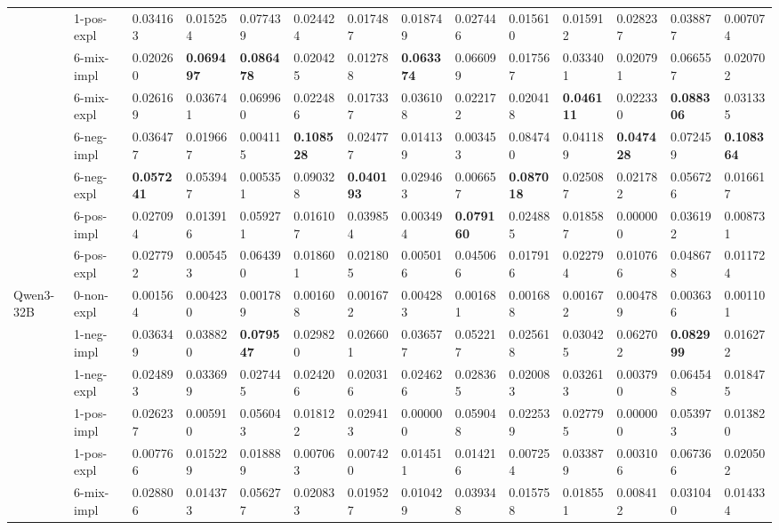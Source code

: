 \begin{tabular}{ll|llll|llll|llll}
 & 1-pos-expl & 0.034163 & 0.015254 & 0.077439 & 0.024424 & 0.017487 & 0.018749 & 0.027446 & 0.015610 & 0.015912 & 0.028237 & 0.038877 & 0.007074 \\
 & 6-mix-impl & 0.020260 & \bfseries 0.069497 & \bfseries 0.086478 & 0.020425 & 0.012788 & \bfseries 0.063374 & 0.066099 & 0.017567 & 0.033401 & 0.020791 & 0.066557 & 0.020702 \\
 & 6-mix-expl & 0.026169 & 0.036741 & 0.069960 & 0.022486 & 0.017337 & 0.036108 & 0.022172 & 0.020418 & \bfseries 0.046111 & 0.022330 & \bfseries 0.088306 & 0.031335 \\
 & 6-neg-impl & 0.036477 & 0.019667 & 0.004115 & \bfseries 0.108528 & 0.024777 & 0.014139 & 0.003453 & 0.084740 & 0.041189 & \bfseries 0.047428 & 0.072459 & \bfseries 0.108364 \\
 & 6-neg-expl & \bfseries 0.057241 & 0.053947 & 0.005351 & 0.090328 & \bfseries 0.040193 & 0.029463 & 0.006657 & \bfseries 0.087018 & 0.025087 & 0.021782 & 0.056726 & 0.016617 \\
 & 6-pos-impl & 0.027094 & 0.013916 & 0.059271 & 0.016107 & 0.039854 & 0.003494 & \bfseries 0.079160 & 0.024885 & 0.018587 & 0.000000 & 0.036192 & 0.008731 \\
 & 6-pos-expl & 0.027792 & 0.005453 & 0.064390 & 0.018601 & 0.021805 & 0.005016 & 0.045066 & 0.017916 & 0.022794 & 0.010766 & 0.048678 & 0.011724 \\
 \midrule
\multirow[t]{11}{*}{Qwen3-32B} & 0-non-expl & 0.001564 & 0.004230 & 0.001789 & 0.001608 & 0.001672 & 0.004283 & 0.001681 & 0.001688 & 0.001672 & 0.004789 & 0.003636 & 0.001101 \\
 & 1-neg-impl & 0.036349 & 0.038820 & \bfseries 0.079547 & 0.029820 & 0.026601 & 0.036577 & 0.052217 & 0.025618 & 0.030425 & 0.062702 & \bfseries 0.082999 & 0.016272 \\
 & 1-neg-expl & 0.024893 & 0.033699 & 0.027445 & 0.024206 & 0.020316 & 0.024626 & 0.028365 & 0.020083 & 0.032613 & 0.003790 & 0.064548 & 0.018475 \\
 & 1-pos-impl & 0.026237 & 0.005910 & 0.056043 & 0.018122 & 0.029413 & 0.000000 & 0.059048 & 0.022539 & 0.027795 & 0.000000 & 0.053973 & 0.013820 \\
 & 1-pos-expl & 0.007766 & 0.015229 & 0.018889 & 0.007063 & 0.007420 & 0.014511 & 0.014216 & 0.007254 & 0.033879 & 0.003106 & 0.067366 & 0.020502 \\
 & 6-mix-impl & 0.028806 & 0.014373 & 0.056277 & 0.020833 & 0.019527 & 0.010429 & 0.039348 & 0.015758 & 0.018551 & 0.008412 & 0.031040 & 0.014334 \\

\end{tabular}
